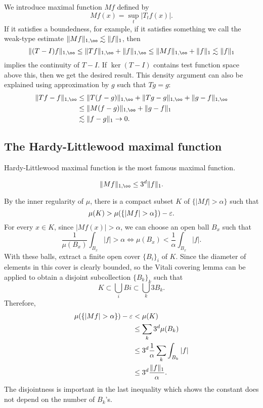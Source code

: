 \documentclass{../crs}
\begin{document}
We introduce maximal function $Mf$ defined by
\[Mf(x)=\sup_t|T_tf(x)|.\]
If it satisfies a boundedness, for example, if it satisfies something we call the weak-type estimate $\|Mf\|_{1,\oo}\lesssim\|f\|_1$, then
\[\|(T-I)f\|_{1,\oo}\le\|Tf\|_{1,\oo}+\|f\|_{1,\oo}\le\|Mf\|_{1,\oo}+\|f\|_1\lesssim\|f\|_1\]
implies the continuity of $T-I$.
If $\ker(T-I)$ contains test function space above this, then we get the desired result.
This density argument can also be explained using approximation by $g$ such that $Tg=g$:
\begin{align*}
\|Tf-f\|_{1,\oo}&\le \|T(f-g)\|_{1,\oo}+\|Tg-g\|_{1,\oo}+\|g-f\|_{1,\oo}\\&\le \|M(f-g)\|_{1,\oo}+\|g-f\|_1\\&\lesssim \|f-g\|_1\to0.
\end{align*}



\subsection{The Hardy-Littlewood maximal function}
Hardy-Littlewood maximal function is the most famous maximal function.

\begin{thm}
\[\|Mf\|_{1,\oo}\le 3^d\|f\|_1.\]
\end{thm}
\begin{pf}
By the inner regularity of $\mu$, there is a compact subset $K$ of $\{|Mf|>\alpha\}$ such that
\[\mu(K)>\mu(\{|Mf|>\alpha\})-\e.\]
For every $x\in K$, since $|Mf(x)|>\alpha$, we can choose an open ball $B_x$ such that
\[\frac1{\mu(B_x)}\int_{B_x}|f|>\alpha\iff\mu(B_x)<\frac1\alpha\int_{B_x}|f|.\]
With these balls, extract a finite open cover $\{B_i\}_i$ of $K$.
Since the diameter of elements in this cover is clearly bounded, so the Vitali covering lemma can be applied to obtain a disjoint subcollection $\{B_k\}_k$ such that
\[K\subset\bigcup_iBi\subset\bigcup_k3B_k.\]
Therefore,
\begin{align*}
\mu(\{|Mf|>\alpha\})-\e
&<\mu(K)\\
&\le\sum_k3^d\mu(B_k)\\
&\le3^d\frac1\alpha\sum_k\int_{B_k}|f|\\
&\le3^d\frac{\|f\|_1}\alpha.
\end{align*}
The disjointness is important in the last inequality which shows the constant does not depend on the number of $B_k$'s.
\end{pf}
\end{document}
